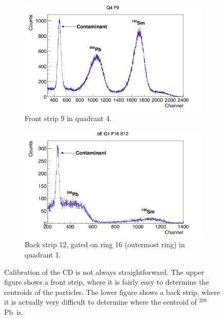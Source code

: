 \documentclass[twoside,english]{uiofysmaster/uiofysmaster}
\newcommand{\Pb}{$^{208}$Pb}
\begin{document}
\begin{figure}[ht]
	\centering
	\begin{subfigure}{\textwidth}
		\centering
		\includegraphics[width=\textwidth]{../Plots/plotting/TB_Q4_F9.png}
		\caption{Front strip 9 in quadrant 4.}
		\label{fig:cal_easy}
	\end{subfigure}
	\begin{subfigure}{\textwidth}
		\centering
		\includegraphics[width=\textwidth]{../Plots/plotting/bE_Q1_f16_b12.png}
		\caption{Back strip 12, gated on ring 16 (outermost ring) in quadrant 1.}
		\label{fig:cal_difficult}
	\end{subfigure}
	\caption{Calibration of the CD is not always straightforward. The upper figure shows a front strip, where it is fairly easy to determine the centroids of the particles. The lower figure shows a back strip, where it is actually very difficult to determine where the centroid of \Pb\ is.}
	\label{fig:cal_ED}
\end{figure}
\end{document}
